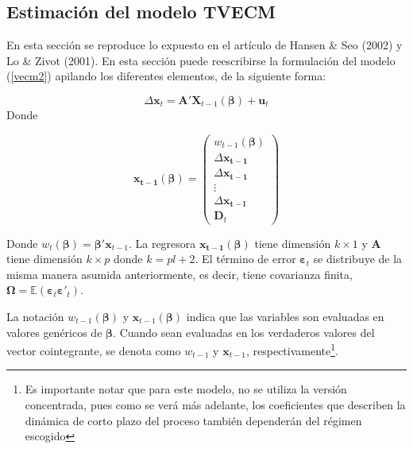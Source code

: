 \documentclass[12pt, twoside]{book}\usepackage[]{graphicx}\usepackage[]{color}
\numberwithin{equation}{section}
\numberwithin{theorem}{section}
\numberwithin{teorema}{section}
\numberwithin{defi}{section}
\numberwithin{prop}{section}
\numberwithin{defi}{section}
\theoremstyle{plain}
\begin{document}
\subsection{Estimación del modelo TVECM}

En esta sección se reproduce lo expuesto en el artículo de Hansen \& Seo (2002) y Lo \& Zivot (2001). En esta sección puede reescribirse la formulación del modelo (\ref{vecm2}) apilando los diferentes elementos, de la siguiente forma: 

\begin{equation}
\Delta \mathbf{x}_{t} = \mathbf{A'X}_{t-1}(\boldsymbol{\beta})+\mathbf{u}_{t}
\end{equation}
Donde 

\begin{equation}
\mathbf{x_{t-1}}(\boldsymbol{\beta}) = \left(\begin{array}{c} w_{t-1}(\boldsymbol{\beta}) \\ %
                                                            \Delta \mathbf{x_{t-1}} \\ %
                                                            \Delta \mathbf{x_{t-1}} \\ %
                                                            \vdots \\ %
                                                            \Delta \mathbf{x_{t-l}} \\ %
                                                            \mathbf{D}_{t}
                                                            \end{array}\right)
\end{equation}

Donde $w_{t}(\boldsymbol{\beta})=\boldsymbol{\beta}'\mathbf{x}_{t-1}$. La regresora $\mathbf{x_{t-1}}(\boldsymbol{\beta})$ tiene dimensión $k\times 1$ y $\mathbf{A}$ tiene dimensión $k\times p$ donde $k=pl+2$. El término de error $\boldsymbol{\varepsilon}_{t}$ se distribuye de la misma manera asumida anteriormente, es decir, tiene  covarianza finita, $\boldsymbol{\Omega} = \mathbb{E}(\boldsymbol{\varepsilon}_{t}\boldsymbol{\varepsilon}'_{t})$. 

La notación $w_{t-1}(\boldsymbol{\beta})$ y $\mathbf{x}_{t-1}(\boldsymbol{\beta})$ indica que las variables son evaluadas en valores genéricos de $\boldsymbol{\beta}$. Cuando sean evaluadas en los verdaderos valores del vector cointegrante, se denota como $w_{t-1}$ y $\mathbf{x}_{t-1}$, respectivamente\footnote{Es importante notar que para este modelo, no se utiliza la versión concentrada, pues como se verá más adelante, los coeficientes que describen la dinámica de corto plazo del proceso también dependerán del régimen escogido}. 
\end{document}
